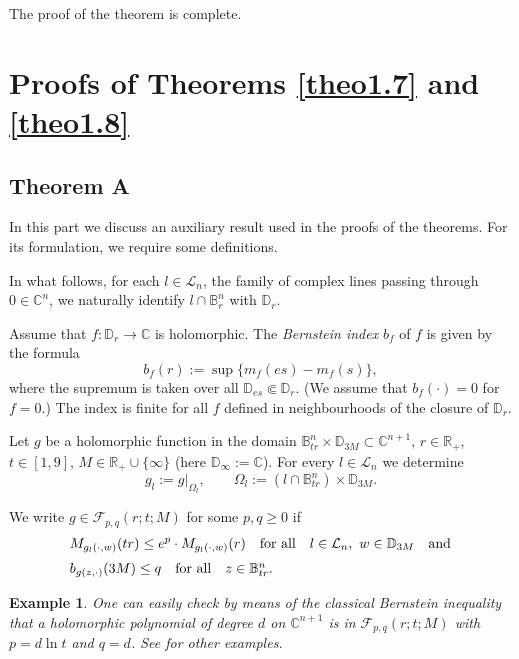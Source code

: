 \documentclass[11pt, oneside]{amsart}
\newtheorem{E}[Th]{Example}
\begin{document}
The proof of the theorem is complete.

\section{Proofs of Theorems \ref{theo1.7} and \ref{theo1.8}}
\subsection{Theorem A} In this part we discuss an auxiliary result used in the proofs of the theorems.
For its formulation, we require some definitions. 

In what follows, for each $l\in\mathcal L_n$, the family of complex lines  passing through  $0\in\mathbb C^n$, we naturally identify $l\cap\mathbb B_r^n$ with $\mathbb D_r$.

 Assume that $f:\mathbb D_r\rightarrow\mathbb C$ is holomorphic. 
The {\em Bernstein index} $b_f$ of $f$ is given by the formula
\[
b_f(r):=\sup\{m_f(es)-m_f(s)\},
\]
where the supremum is taken over all $\mathbb D_{es}\Subset\mathbb D_r$. (We assume that $b_f(\cdot)=0$ for $f=0$.) The index is 
finite for all $f$ defined in  neighbourhoods of the closure of $\mathbb D_r$. 

Let $g$ be a holomorphic function in the domain $\mathbb B_{tr}^n\times \mathbb D_{3M}\subset\mathbb C^{n+1}$, $r\in\mathbb R_+$, $t\in [1,9]$, $M\in\mathbb R_+\cup\{\infty\}$ (here $\mathbb D_\infty:=\mathbb C$). For every $l\in\mathcal L_n$ we determine
\[
g_l:=g|_{\Omega_l},\qquad \Omega_l:=(l\cap\mathbb B_{tr}^n)\times \mathbb D_{3M}.
\]

We write $g\in {\mathcal F}_{p,q}(r;t;M)$ for some $p,q\ge 0$ if
\begin{equation}
\begin{array}{l}
\displaystyle
M_{g_l(\cdot,w)}(tr)\le e^p\cdot M_{g_l(\cdot,w)}(r)\quad {\rm for\ all}\quad l\in\mathcal L_n,\ w\in\mathbb D_{3M}\quad {\rm and}\medskip\\
b_{g(z,\cdot)}(3M)\le q\quad {\rm for\ all}\quad z\in\mathbb B_{tr}^n .
\end{array}
\end{equation}
\begin{E}
{\rm One can easily check by means of the classical Bernstein inequality that a holomorphic polynomial of degree $d$ on $\mathbb C^{n+1}$ is in $\mathcal F_{p,q}(r ; t ; M)$ with $p = d \ln t$ and $q = d$. See \cite{B} for other examples.}
\end{E} 
\end{document}
